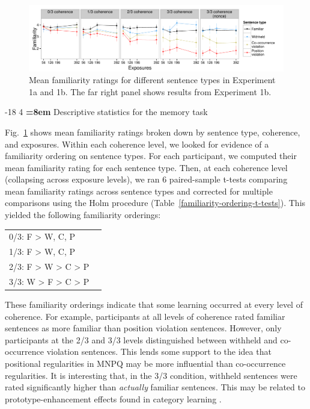 \documentclass[man,longtable,floatsintext]{my-apa6}
\makeatletter
\renewcommand\subsubsection{\@startsection{subsubsection}{3}{\z@}%
                       {-18\p@ \@plus -4\p@ \@minus -4\p@}%
                       {4\p@ \@plus 2\p@ \@minus 2\p@}%
                       {\normalfont\normalsize\bfseries\boldmath
                        \rightskip=\z@ \@plus 8em\pretolerance=10000 }}
\makeatother
\begin{document}
\begin{figure}[t]
  \begin{center}
    \includegraphics[width=1.0\linewidth]{x1-descriptive-memory}
    \caption{Mean familiarity ratings for different sentence types in Experiment 1a and 1b. The far right panel shows results from Experiment 1b.}
    \label{x1-descriptive-mem}
  \end{center}
\end{figure}

\subsubsection{Descriptive statistics for the memory task}

Fig.~\ref{x1-descriptive-mem} shows mean familiarity ratings broken down by sentence type, coherence, and exposures. Within each coherence level, we looked for evidence of a familiarity ordering on sentence types. For each participant, we computed their mean familiarity rating for each sentence type. Then, at each coherence level (collapsing across exposure levels), we ran 6 paired-sample t-tests comparing mean familiarity ratings across sentence types and corrected for multiple comparisons using the Holm procedure (Table~\ref{familiarity-ordering-t-tests}). This yielded the following familiarity orderings:
\begin{center}
  \begin{tabular}{l l }
    0/3: F > W, C, P & \\
    1/3: F > W, C, P & \\
    2/3: F > W > C > P & \\
    3/3: W > F > C > P & \\
  \end{tabular}
\end{center}
\noindent These familiarity orderings indicate that some learning occurred at every level of coherence. For example, participants at all levels of coherence rated familiar sentences as more familiar than position violation sentences. However, only participants at the 2/3 and 3/3 levels distinguished between withheld and co-occurrence violation sentences. This lends some support to the idea that positional regularities in MNPQ may be more influential than co-occurrence regularities. It is interesting that, in the 3/3 condition, withheld sentences were rated significantly higher than \emph{actually} familiar sentences. This may be related to prototype-enhancement effects found in category learning \citep[e.g.,][]{smith2002}.
\end{document}
